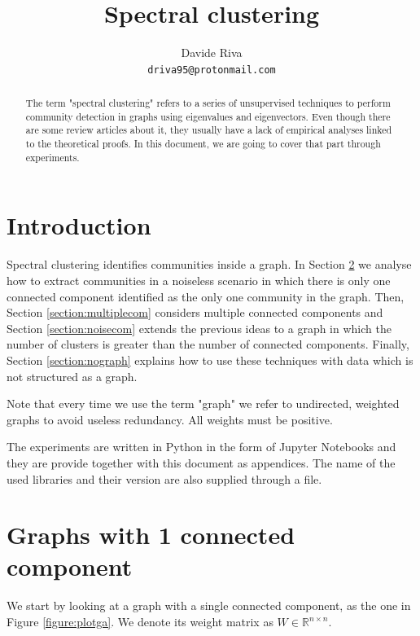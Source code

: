 \documentclass{article}
\title{Spectral clustering}
\author{%
  Davide Riva \\
  \texttt{driva95@protonmail.com}
}
\begin{document}
\maketitle

\begin{abstract}
    The term "spectral clustering" refers to a series of unsupervised techniques to perform community detection in graphs using eigenvalues and eigenvectors.
    Even though there are some review articles about it, they usually have a lack of empirical analyses linked to the theoretical proofs.
    In this document, we are going to cover that part through experiments.
\end{abstract}

\section{Introduction}
Spectral clustering identifies communities inside a graph.
In Section \ref{section:twocom} we analyse how to extract communities in a noiseless scenario
in which there is only one connected component identified as the only one community in the graph.
Then, Section \ref{section:multiplecom} considers multiple connected components and
Section \ref{section:noisecom} extends the previous ideas to a graph in which
the number of clusters is greater than the number of connected components.
Finally, Section \ref{section:nograph} explains how to use these techniques with data
which is not structured as a graph.

Note that every time we use the term "graph" we refer to undirected, weighted graphs
to avoid useless redundancy. All weights must be positive.

The experiments are written in Python in the form of Jupyter Notebooks
and they are provide together with this document as appendices.
The name of the used libraries and their version are also supplied through a  file.

\section{Graphs with 1 connected component} \label{section:twocom}
We start by looking at a graph with a single connected component, as the one in Figure \ref{figure:plotga}.
We denote its weight matrix as $W \in \mathbb{R}^{n \times n}$.
\end{document}
